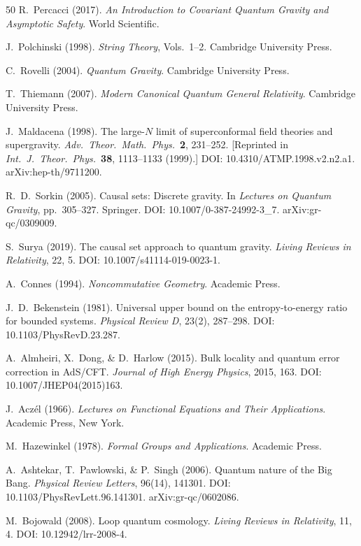 \documentclass[aps,prd,twocolumn,superscriptaddress,nofootinbib]{revtex4-2}
\begin{document}
\begin{thebibliography}{50}
R.~Percacci (2017).
\textit{An Introduction to Covariant Quantum Gravity and Asymptotic Safety}.
World Scientific.

J.~Polchinski (1998).
\textit{String Theory}, Vols.~1--2.
Cambridge University Press.

C.~Rovelli (2004).
\textit{Quantum Gravity}.
Cambridge University Press.

T.~Thiemann (2007).
\textit{Modern Canonical Quantum General Relativity}.
Cambridge University Press.

J.~Maldacena (1998).
The large-$N$ limit of superconformal field theories and supergravity.
\textit{Adv.\ Theor.\ Math.\ Phys.}\ \textbf{2}, 231--252.
[Reprinted in \textit{Int.\ J.\ Theor.\ Phys.}\ \textbf{38}, 1113--1133 (1999).]
DOI: 10.4310/ATMP.1998.v2.n2.a1.
arXiv:hep-th/9711200.

R.~D.~Sorkin (2005).
Causal sets: Discrete gravity.
In \textit{Lectures on Quantum Gravity}, pp.\ 305--327.
Springer.
DOI: 10.1007/0-387-24992-3\_7.
arXiv:gr-qc/0309009.

S.~Surya (2019).
The causal set approach to quantum gravity.
\textit{Living Reviews in Relativity}, 22, 5.
DOI: 10.1007/s41114-019-0023-1.

A.~Connes (1994).
\textit{Noncommutative Geometry}.
Academic Press.

J.~D.~Bekenstein (1981).
Universal upper bound on the entropy-to-energy ratio for bounded systems.
\textit{Physical Review D}, 23(2), 287--298.
DOI: 10.1103/PhysRevD.23.287.

A.~Almheiri, X.~Dong, \& D.~Harlow (2015).
Bulk locality and quantum error correction in AdS/CFT.
\textit{Journal of High Energy Physics}, 2015, 163.
DOI: 10.1007/JHEP04(2015)163.

J.~Acz\'el (1966).
\textit{Lectures on Functional Equations and Their Applications}.
Academic Press, New York.

M.~Hazewinkel (1978).
\textit{Formal Groups and Applications}.
Academic Press.

A.~Ashtekar, T.~Pawlowski, \& P.~Singh (2006).
Quantum nature of the Big Bang.
\textit{Physical Review Letters}, 96(14), 141301.
DOI: 10.1103/PhysRevLett.96.141301.
arXiv:gr-qc/0602086.

M.~Bojowald (2008).
Loop quantum cosmology.
\textit{Living Reviews in Relativity}, 11, 4.
DOI: 10.12942/lrr-2008-4.


\end{thebibliography}
\end{document}
